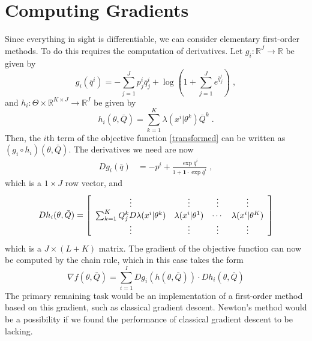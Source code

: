 \documentclass[english]{scrartcl}
\newcommand\R[0]{\mathbb{R}}
\begin{document}
	\section{Computing Gradients}
		Since everything in sight is differentiable, we can consider elementary first-order methods. To do this requires the computation of derivatives. Let $g_i:\R^J \rightarrow \R$ be given by
		\begin{equation}
			g_i(\bar{q}^i) = - \sum_{j = 1}^J p^i_j \bar{q}^i_j  + \log \left(1 + \sum_{j = 1}^J e^{\bar{q}^i_j}\right)\;,
		\end{equation}
		and $h_i:\Theta \times \R^{K\times J} \rightarrow \R^J$ be given by
		\begin{equation}
		 	h_i(\theta, \bar{Q}) = \sum_{k=1}^K \lambda(x^i|\theta^k) \bar{Q}^k\;.
		\end{equation}
		Then, the $i$th term of the objective function \eqref{transformed} can be written as $(g_i \circ h_i)(\theta, \bar{Q})$. The derivatives we need are now
		\begin{align}
			Dg_i(\bar{q}) &=  -p^i + \frac{\exp \bar{q}^i}{1 + \mathbf{1} \cdot \exp{\bar{q}^i}} \;,
		\end{align}
		which is a $1\times J$ row vector, and
		\begin{align}
			Dh_i(\theta, \bar{Q}) = \left[\begin{array}{c c c c}
				\vdots & \vdots & \vdots & \vdots \\
				\sum_{k=1}^K Q^k_j D \lambda(x^i|\theta^k) & \lambda(x^i|\theta^1) & \cdots &  \lambda(x^i|\theta^K)\\
				\vdots & \vdots & \vdots & \vdots
			\end{array}\right]
		\end{align}
		which is a $J \times (L + K)$ matrix. The gradient of the objective function can now be computed by the chain rule, which in this case takes the form
		\begin{equation}
			\nabla f(\theta, \bar{Q}) = \sum_{i=1}^I Dg_i(h(\theta, \bar{Q})) \cdot Dh_i(\theta,\bar{Q})
		\end{equation}
		The primary remaining task would be an implementation of a first-order method based on this gradient, such as classical gradient descent. Newton's method would be a possibility if we found the performance of classical gradient descent to be lacking.
\end{document}

